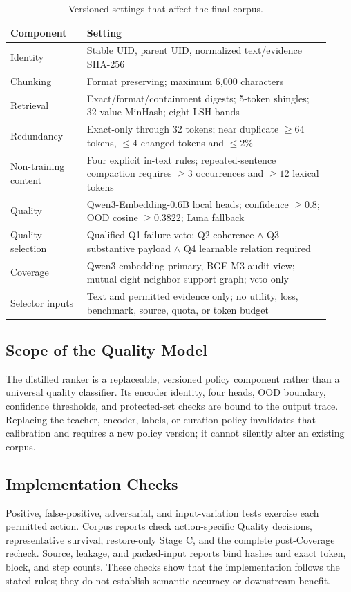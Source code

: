 \documentclass[conference]{IEEEtran}
\begin{document}
\begin{table}[!t]
\caption{Versioned settings that affect the final corpus.}
\label{tab:implementation}
\centering
\footnotesize
\renewcommand{\arraystretch}{1.08}
\setlength{\tabcolsep}{3pt}
\begin{tabular}{@{}L{0.22\linewidth}L{0.70\linewidth}@{}}
\toprule
Component & Setting \\
\midrule
Identity & Stable UID, parent UID, normalized text/evidence SHA-256 \\
Chunking & Format preserving; maximum 6,000 characters \\
Retrieval & Exact/format/containment digests; 5-token shingles; 32-value MinHash; eight LSH bands \\
Redundancy & Exact-only through 32 tokens; near duplicate $\geq64$ tokens, $\leq4$ changed tokens and $\leq2\%$ \\
Non-training content & Four explicit in-text rules; repeated-sentence compaction requires $\geq3$ occurrences and $\geq12$ lexical tokens \\
Quality & Qwen3-Embedding-0.6B local heads; confidence $\geq0.8$; OOD cosine $\geq0.3822$; Luna fallback \\
Quality selection & Qualified Q1 failure veto; Q2 coherence $\land$ Q3 substantive payload $\land$ Q4 learnable relation required \\
Coverage & Qwen3 embedding primary, BGE-M3 audit view; mutual eight-neighbor support graph; veto only \\
Selector inputs & Text and permitted evidence only; no utility, loss, benchmark, source, quota, or token budget \\
\bottomrule
\end{tabular}
\end{table}

\subsection{Scope of the Quality Model}
The distilled ranker is a replaceable, versioned policy component rather than
a universal quality classifier. Its encoder identity, four heads, OOD boundary,
confidence thresholds, and protected-set checks are bound to the output trace.
Replacing the teacher, encoder, labels, or curation policy invalidates that
calibration and requires a new policy version; it cannot silently alter an
existing corpus.

\subsection{Implementation Checks}
Positive, false-positive, adversarial, and input-variation tests exercise each
permitted action. Corpus reports check action-specific Quality decisions,
representative survival, restore-only Stage C, and the complete post-Coverage
recheck. Source, leakage, and packed-input
reports bind hashes and exact token, block, and step counts. These checks show
that the implementation follows the stated rules; they do not establish semantic
accuracy or downstream benefit.
\end{document}
